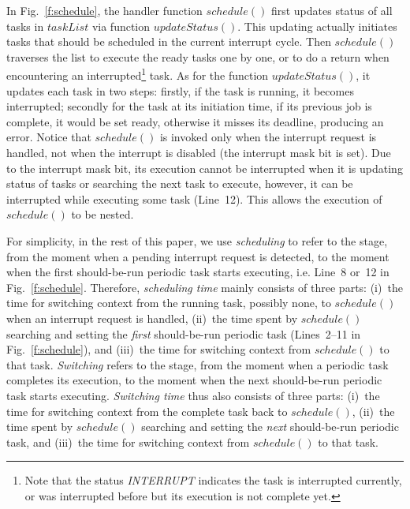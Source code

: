 \documentclass[12pt,onecolumn]{IEEEtranTIE}
\begin{document}
In Fig.~\ref{f:schedule}, the handler function $\mathit{schedule()}$
first updates status of all tasks in $\mathit{taskList}$ via function
$\mathit{updateStatus()}$. This updating actually initiates tasks that
should be scheduled in the current interrupt cycle. Then
$\mathit{schedule()}$ traverses the list to execute the ready tasks
one by one, or to do a return when encountering an
interrupted\footnote{Note that the status \textit{INTERRUPT} indicates
  the task is interrupted currently, or was interrupted before but its
  execution is not complete yet.}  task. As for the function
$\mathit{updateStatus()}$, it updates each task in two steps: firstly,
if the task is running, it becomes interrupted; secondly for the task
at its initiation time, if its previous job is complete, it would be
set ready, otherwise it misses its deadline, producing an
error. Notice that $\mathit{schedule()}$ is invoked only when the
interrupt request is handled, not when the interrupt is disabled (the
interrupt mask bit is set). Due to the interrupt mask bit, its
execution cannot be interrupted when it is updating status of tasks or
searching the next task to execute, however, it can be interrupted
while executing some task (Line~12). This allows the execution of
$\mathit{schedule()}$ to be nested.

For simplicity, in the rest of this paper, we use \emph{scheduling} to
refer to the stage, from the moment when a pending interrupt request
is detected, to the moment when the first should-be-run periodic task
starts executing, i.e. Line~8 or~12 in
Fig.~\ref{f:schedule}. Therefore, \emph{scheduling time} mainly
consists of three parts: (i)~the time for switching context from the
running task, possibly none, to $\mathit{schedule()}$ when an
interrupt request is handled, (ii)~the time spent by
$\mathit{schedule()}$ searching and setting the \emph{first}
should-be-run periodic task (Lines~2--11 in Fig.~\ref{f:schedule}),
and (iii)~the time for switching context from $\mathit{schedule()}$ to
that task. \emph{Switching} refers to the stage, from the moment when
a periodic task completes its execution, to the moment when the next
should-be-run periodic task starts executing. \emph{Switching time}
thus also consists of three parts: (i)~the time for switching context
from the complete task back to $\mathit{schedule()}$, (ii)~the time
spent by $\mathit{schedule()}$ searching and setting the \emph{next}
should-be-run periodic task, and (iii)~the time for switching context
from $\mathit{schedule()}$ to that task.
\end{document}
